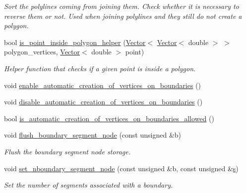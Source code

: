 \begin{DoxyCompactItemize}
\begin{DoxyCompactList}\small\item\em Sort the polylines coming from joining them. Check whether it is necessary to reverse them or not. Used when joining polylines and they still do not create a polygon. \end{DoxyCompactList}\item 
bool \hyperlink{classoomph_1_1UnstructuredTwoDMeshGeometryBase_adc3f1f9607dcf468c6cfb458538248df}{is\+\_\+point\+\_\+inside\+\_\+polygon\+\_\+helper} (\hyperlink{classoomph_1_1Vector}{Vector}$<$ \hyperlink{classoomph_1_1Vector}{Vector}$<$ double $>$ $>$ polygon\+\_\+vertices, \hyperlink{classoomph_1_1Vector}{Vector}$<$ double $>$ point)
\begin{DoxyCompactList}\small\item\em Helper function that checks if a given point is inside a polygon. \end{DoxyCompactList}\item 
void \hyperlink{classoomph_1_1UnstructuredTwoDMeshGeometryBase_a745b1231879429cfb16c2c7b59fbdad6}{enable\+\_\+automatic\+\_\+creation\+\_\+of\+\_\+vertices\+\_\+on\+\_\+boundaries} ()
\item 
void \hyperlink{classoomph_1_1UnstructuredTwoDMeshGeometryBase_a1c91523d587f6cabf3c1fc275799a83d}{disable\+\_\+automatic\+\_\+creation\+\_\+of\+\_\+vertices\+\_\+on\+\_\+boundaries} ()
\item 
bool \hyperlink{classoomph_1_1UnstructuredTwoDMeshGeometryBase_a23b5ebef48eda89918643c78e927b94a}{is\+\_\+automatic\+\_\+creation\+\_\+of\+\_\+vertices\+\_\+on\+\_\+boundaries\+\_\+allowed} ()
\item 
void \hyperlink{classoomph_1_1UnstructuredTwoDMeshGeometryBase_aefb9c0246505a9f260ed7f91022d6576}{flush\+\_\+boundary\+\_\+segment\+\_\+node} (const unsigned \&b)
\begin{DoxyCompactList}\small\item\em Flush the boundary segment node storage. \end{DoxyCompactList}\item 
void \hyperlink{classoomph_1_1UnstructuredTwoDMeshGeometryBase_a3928fb706b699964e0705a7fe2a1c8dc}{set\+\_\+nboundary\+\_\+segment\+\_\+node} (const unsigned \&b, const unsigned \&\hyperlink{cfortran_8h_ab7123126e4885ef647dd9c6e3807a21c}{s})
\begin{DoxyCompactList}\small\item\em Set the number of segments associated with a boundary. \end{DoxyCompactList}\item 

\end{DoxyCompactItemize}
